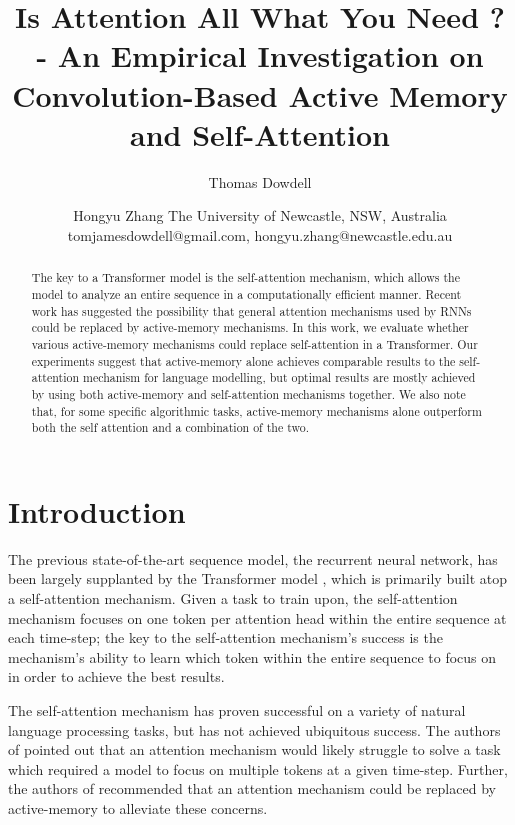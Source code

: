\documentclass{article}
\title{Is Attention All What You Need ? - An Empirical Investigation on  Convolution-Based Active Memory and Self-Attention}
\author{
Thomas Dowdell\and
Hongyu Zhang
\affiliations
The University of Newcastle, NSW, Australia
\emails
tomjamesdowdell@gmail.com,
hongyu.zhang@newcastle.edu.au
}
\begin{document}
\maketitle

\begin{abstract}
  The key to a Transformer model is the self-attention mechanism, which allows the model to analyze an entire sequence in a computationally efficient manner. Recent work has suggested the possibility that general attention mechanisms used by RNNs could be replaced by active-memory mechanisms. In this work, we evaluate whether various active-memory mechanisms could replace self-attention in a Transformer. Our experiments suggest that active-memory alone achieves comparable results to the self-attention mechanism for language modelling, but optimal results are mostly achieved by using both active-memory and self-attention mechanisms together. We also note that, for some specific algorithmic tasks, active-memory mechanisms alone outperform both the self attention and a combination of the two. 
\end{abstract}

\section{Introduction}

The previous state-of-the-art sequence model, the recurrent neural network, has been largely supplanted by the Transformer model \cite{vaswani2017}, which is primarily built atop a self-attention mechanism. Given a task to train upon, the self-attention mechanism focuses on one token per attention head within the entire sequence at each time-step; the key to the self-attention mechanism’s success is the mechanism’s ability to learn which token within the entire sequence to focus on in order to achieve the best results.

The self-attention mechanism has proven successful on a variety of natural language processing tasks, but has not achieved ubiquitous success. The authors of \cite{kaiser2016} pointed out that an attention mechanism would likely struggle to solve a task which required a model to focus on multiple tokens at a given time-step. Further, the authors of \cite{kaiser2015} recommended that an attention mechanism could be replaced by active-memory to alleviate these concerns.
\end{document}
